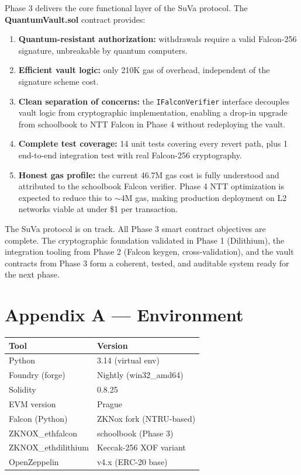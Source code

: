 \documentclass[11pt,a4paper]{article}
\begin{document}
Phase 3 delivers the core functional layer of the SuVa protocol. The \textbf{QuantumVault.sol} contract provides:

\begin{enumerate}
  \item \textbf{Quantum-resistant authorization:} withdrawals require a valid Falcon-256 signature, unbreakable by quantum computers.
  \item \textbf{Efficient vault logic:} only 210K gas of overhead, independent of the signature scheme cost.
  \item \textbf{Clean separation of concerns:} the \texttt{IFalconVerifier} interface decouples vault logic from cryptographic implementation, enabling a drop-in upgrade from schoolbook to NTT Falcon in Phase 4 without redeploying the vault.
  \item \textbf{Complete test coverage:} 14 unit tests covering every revert path, plus 1 end-to-end integration test with real Falcon-256 cryptography.
  \item \textbf{Honest gas profile:} the current 46.7M gas cost is fully understood and attributed to the schoolbook Falcon verifier. Phase 4 NTT optimization is expected to reduce this to $\sim$4M gas, making production deployment on L2 networks viable at under \$1 per transaction.
\end{enumerate}

The SuVa protocol is on track. All Phase 3 smart contract objectives are complete. The cryptographic foundation validated in Phase 1 (Dilithium), the integration tooling from Phase 2 (Falcon keygen, cross-validation), and the vault contracts from Phase 3 form a coherent, tested, and auditable system ready for the next phase.

\appendix
\section{Appendix A --- Environment}

\begin{center}
\begin{tabular}{ll}
\toprule
\textbf{Tool} & \textbf{Version} \\
\midrule
Python & 3.14 (virtual env) \\
Foundry (forge) & Nightly (win32\_amd64) \\
Solidity & 0.8.25 \\
EVM version & Prague \\
Falcon (Python) & ZKNox fork (NTRU-based) \\
ZKNOX\_ethfalcon & schoolbook (Phase 3) \\
ZKNOX\_ethdilithium & Keccak-256 XOF variant \\
OpenZeppelin & v4.x (ERC-20 base) \\
\bottomrule
\end{tabular}
\end{center}
\end{document}

